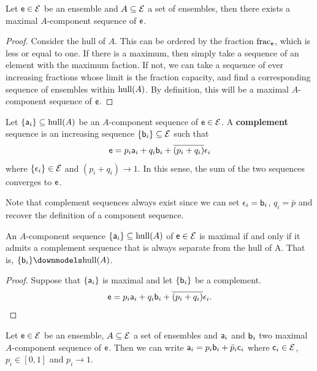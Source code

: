 \begin{prop}
	Let $\ens \in \Ens$ be an ensemble and $A \subseteq \Ens$ a set of ensembles, then there exists a maximal $A$-component sequence of $\ens$.
\end{prop}

\begin{proof}
	Consider the hull of $A$. This can be ordered by the fraction $\size_{\ens}$, which is less or equal to one. If there is a maximum, then simply take a sequence of an element with the maximum faction. If not, we can take a sequence of ever increasing fractions whose limit is the fraction capacity, and find a corresponding sequence of ensembles within $\hull(A)$. By definition, this will be a maximal $A$-component sequence of $\ens$.
\end{proof}

\begin{prop}
	Let $\{\ens[a]_i\} \subseteq \hull(A)$ be an $A$-component sequence of $\ens \in \Ens$. A \textbf{complement} sequence is an increasing sequence $\{\ens[b]_i\} \subseteq \Ens$ such that
	$$ \ens = p_i \ens[a]_i + q_i \ens[b]_i + \overline{(p_i + q_i)} \ens[\epsilon]_i $$
	where $\{\ens[\epsilon]_i\} \in \Ens$ and $(p_i + q_i) \to 1$. In this sense, the sum of the two sequences converges to $\ens$.
\end{prop}

\begin{remark}
	Note that complement sequences always exist since we can set $\ens[\epsilon]_i = \ens[b]_i$, $q_i = \bar{p}$ and recover the definition of a component sequence.
\end{remark}

\begin{prop}
	An $A$-component sequence $\{\ens[a]_i\} \subseteq \hull(A)$ of $\ens \in \Ens$ is maximal if and only if it admits a complement sequence that is always separate from the hull of A. That is, $\{\ens[b]_i\} \separate \hull(A)$.
\end{prop}

\begin{proof}
	Suppose that $\{\ens[a]_i\}$ is maximal and let $\{\ens[b]_i\}$ be a complement.
	$$ \ens = p_i \ens[a]_i + q_i \ens[b]_i + \overline{(p_i + q_i)} \ens[\epsilon]_i.$$
	
\end{proof}

\begin{prop}
	Let $\ens \in \Ens$ be an ensemble, $A \subseteq \Ens$ a set of ensembles and $\ens[a]_i$ and $\ens[b]_i$ two maximal $A$-component sequence of $\ens$. Then we can write $\ens[a]_i = p_i \ens[b]_i + \bar{p}_i \ens[c]_i$ where $\ens[c]_i \in \Ens$, $p_i \in [0,1]$ and $p_i \to 1$.
\end{prop}

